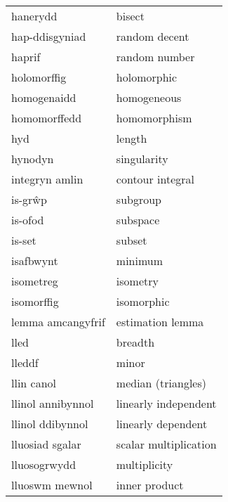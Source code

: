 \begin{supertabular}{p{0.22\textwidth}p{0.22\textwidth}}
                        hanerydd &                            bisect \\
                  hap-ddisgyniad &                     random decent \\
                          haprif &                     random number \\
                     holomorffig &                       holomorphic \\
                     homogenaidd &                       homogeneous \\
                    homomorffedd &                      homomorphism \\
                             hyd &                            length \\
                         hynodyn &                       singularity \\
                  integryn amlin &                  contour integral \\
                         is-grŵp &                          subgroup \\
                         is-ofod &                          subspace \\
                          is-set &                            subset \\
                       isafbwynt &                           minimum \\
                       isometreg &                          isometry \\
                      isomorffig &                        isomorphic \\
               lemma amcangyfrif &                  estimation lemma \\
                            lled &                           breadth \\
                          lleddf &                             minor \\
                      llin canol &                median (triangles) \\
               llinol annibynnol &              linearly independent \\
                llinol ddibynnol &                linearly dependent \\
                 lluosiad sgalar &             scalar multiplication \\
                    lluosogrwydd &                      multiplicity \\
                  lluoswm mewnol &                     inner product \\

\end{supertabular}
